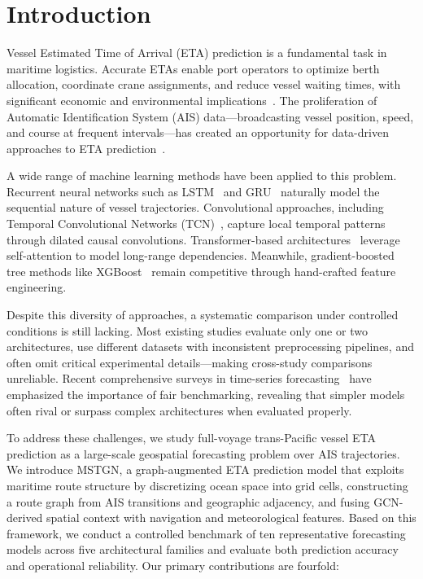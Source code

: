 \documentclass[sigconf,anonymous]{acmart}%
\begin{document}


\maketitle

\section{Introduction}

Vessel Estimated Time of Arrival (ETA) prediction is a fundamental task in maritime logistics.
Accurate ETAs enable port operators to optimize berth allocation, coordinate crane assignments, and reduce vessel waiting times, with significant economic and environmental implications~\cite{unctad2023}.
The proliferation of Automatic Identification System (AIS) data---broadcasting vessel position, speed, and course at frequent intervals---has created an opportunity for data-driven approaches to ETA prediction~\cite{fang2022}.

A wide range of machine learning methods have been applied to this problem.
Recurrent neural networks such as LSTM~\cite{zhang2022lstm} and GRU~\cite{han2021gru} naturally model the sequential nature of vessel trajectories.
Convolutional approaches, including Temporal Convolutional Networks (TCN)~\cite{bai2018tcn}, capture local temporal patterns through dilated causal convolutions.
Transformer-based architectures~\cite{dong2023transformer, zhou2021informer} leverage self-attention to model long-range dependencies.
Meanwhile, gradient-boosted tree methods like XGBoost~\cite{chen2016xgboost} remain competitive through hand-crafted feature engineering.

Despite this diversity of approaches, a systematic comparison under controlled conditions is still lacking.
Most existing studies evaluate only one or two architectures, use different datasets with inconsistent preprocessing pipelines, and often omit critical experimental details---making cross-study comparisons unreliable.
Recent comprehensive surveys in time-series forecasting~\cite{kim2025comprehensive, zeng2023transformers} have emphasized the importance of fair benchmarking, revealing that simpler models often rival or surpass complex architectures when evaluated properly.

To address these challenges, we study full-voyage trans-Pacific vessel ETA prediction as a large-scale geospatial forecasting problem over AIS trajectories. We introduce MSTGN, a graph-augmented ETA prediction model that exploits maritime route structure by discretizing ocean space into grid cells, constructing a route graph from AIS transitions and geographic adjacency, and fusing GCN-derived spatial context with navigation and meteorological features. Based on this framework, we conduct a controlled benchmark of ten representative forecasting models across five architectural families and evaluate both prediction accuracy and operational reliability. Our primary contributions are fourfold:
\end{document}
